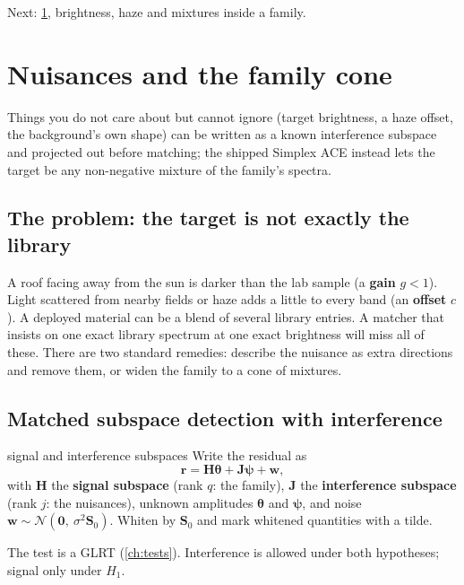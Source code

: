 \documentclass[11pt,a4paper,oneside,openany]{book}
\newcommand{\B}[1]{{\symbf{#1}}}
\newcommand{\B}[1]{{\bm{#1}}}
\newcommand{\vr}{\B{r}}
\newcommand{\vw}{\B{w}}
\newcommand{\vtheta}{\B{\theta}}
\newcommand{\vpsi}{\B{\psi}}
\newcommand{\mS}{\B{S}}
\newcommand{\mH}{\B{H}}
\newcommand{\mJ}{\B{J}}
\newcommand{\nextchapter}[1]{\par\medskip\noindent\hfill\textsf{\small Next: #1}\par}
\begin{document}
\nextchapter{\cref{ch:nuisance}, brightness, haze and mixtures inside a family.}

\chapter{Nuisances and the family cone}
\label{ch:nuisance}

\begin{onething}
Things you do not care about but cannot ignore (target brightness, a haze offset, the background's own shape) can be written as a known
interference subspace and projected out before matching; the shipped Simplex ACE instead lets the target be any non-negative mixture of the
family's spectra.
\end{onething}

\section{The problem: the target is not exactly the library}

A roof facing away from the sun is darker than the lab sample (a \textbf{gain} $g<1$). Light scattered from nearby fields or haze adds a little to
every band (an \textbf{offset} $c$). A deployed material can be a blend of several library entries. A matcher that insists on one exact library
spectrum at one exact brightness will miss all of these. There are two standard remedies: describe the nuisance as extra directions and remove
them, or widen the family to a cone of mixtures.

\section{Matched subspace detection with interference}

\begin{defn}{signal and interference subspaces}
Write the residual as
\[
  \vr=\mH\vtheta+\mJ\vpsi+\vw,
\]
with $\mH$ the \textbf{signal subspace} (rank $q$: the family), $\mJ$ the \textbf{interference subspace} (rank $j$: the nuisances), unknown amplitudes
$\vtheta$ and $\vpsi$, and noise $\vw\sim\mathcal N(\B0,\ \sigma^2\mS_0)$. Whiten by $\mS_0$ and mark whitened quantities with a tilde.
\end{defn}

The test is a GLRT (\cref{ch:tests}). Interference is allowed under both hypotheses; signal only under $H_1$.
\end{document}
